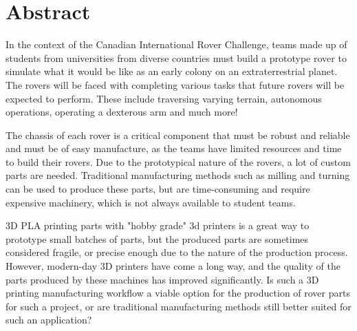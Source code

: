 \documentclass[type=report,foot=true,colorhead=true]{rwuthesis} %
\title{\batitle}
\author{Jose Luiz S. Mendonça}
\date{\today}
\begin{document}
\maketitle

\newpage
\tableofcontents
\newpage

\chapter{Abstract}




	In the context of the Canadian International Rover Challenge, teams made up of students from universities from diverse countries must build a prototype rover to simulate what it would be like as an early colony on an extraterrestrial planet. The rovers will be faced with completing various tasks that future rovers will be expected to perform. These include traversing varying terrain, autonomous operations, operating a dexterous arm and much more!

	The chassis of each rover is a critical component that must be robust and reliable and must be of easy manufacture, as the teams have limited resources and time to build their rovers. Due to the prototypical nature of the rovers, a lot of custom parts are needed. Traditional manufacturing methods such as milling and turning can be used to produce these parts, but are time-consuming and require expensive machinery, which is not always available to student teams.

	3D PLA printing parts with "hobby grade" 3d printers is a great way to prototype small batches of parts, but the produced parts are sometimes considered fragile, or precise enough due to the nature of the production process. However, modern-day 3D printers have come a long way, and the quality of the parts produced by these machines has improved significantly. Is such a 3D printing manufacturing workflow a viable option for the production of rover parts for such a project, or are traditional manufacturing methods still better suited for such an application?
\end{document}
